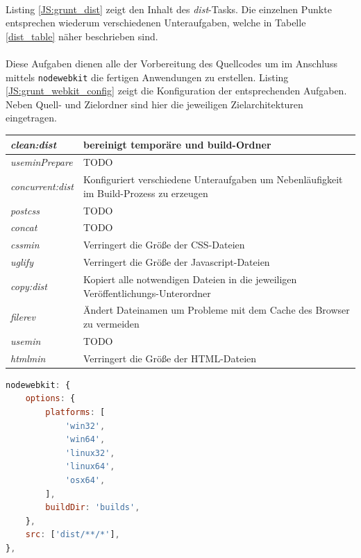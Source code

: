\paragraph{}Listing \ref{JS:grunt_dist} zeigt den Inhalt des \textit{dist}-Tasks. Die einzelnen Punkte entsprechen wiederum verschiedenen Unteraufgaben, welche in Tabelle \ref{dist_table} näher beschrieben sind.

\paragraph{}Diese Aufgaben dienen alle der Vorbereitung des Quellcodes um im Anschluss mittels \texttt{nodewebkit} die fertigen Anwendungen zu erstellen. Listing \ref{JS:grunt_webkit_config} zeigt die Konfiguration der entsprechenden Aufgaben. Neben Quell- und Zielordner sind hier die jeweiligen Zielarchitekturen eingetragen.

\begin{tabularx}{0.92\textwidth}{lX}
	\textit{clean:dist} & bereinigt temporäre und build-Ordner\\ \hline
	\textit{useminPrepare} & TODO\\ \hline
	\textit{concurrent:dist} & Konfiguriert verschiedene Unteraufgaben um Nebenläufigkeit im Build-Prozess zu erzeugen\\ \hline
	\textit{postcss} & TODO\\ \hline
	\textit{concat} & TODO\\ \hline
	\textit{cssmin} & Verringert die Größe der CSS-Dateien\\ \hline
	\textit{uglify} & Verringert die Größe der Javascript-Dateien\\ \hline
	\textit{copy:dist} & Kopiert alle notwendigen Dateien in die jeweiligen Veröffentlichungs-Unterordner\\ \hline
	\textit{filerev} & Ändert Dateinamen um Probleme mit dem Cache des Browser zu vermeiden\\ \hline
	\textit{usemin} &  TODO\\ \hline
	\textit{htmlmin} & Verringert die Größe der HTML-Dateien\\ \hline
\end{tabularx}
\label{dist_table}
\vspace*{1cm}

\begin{lstlisting}[language=JavaScript,label=JS:grunt_webkit_config,caption=grunt nodewebkit-Konfiguration]
nodewebkit: {
	options: {
		platforms: [
			'win32',
			'win64',
			'linux32',
			'linux64',
			'osx64',
		],
		buildDir: 'builds',
	},
	src: ['dist/**/*'],
},
\end{lstlisting}


